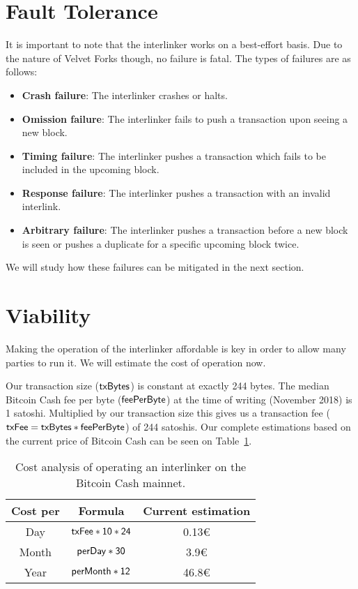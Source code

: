 
\section{Fault Tolerance}
It is important to note that the interlinker works on a best-effort basis. Due to the nature of Velvet Forks though, no failure is fatal. The types of failures are as follows:

\begin{itemize}
  \item \textbf{Crash failure}: The interlinker crashes or halts.
  \item \textbf{Omission failure}: The interlinker fails to push a transaction upon seeing a new block.
  \item \textbf{Timing failure}: The interlinker pushes a transaction which fails to be included in the upcoming block.
  \item \textbf{Response failure}: The interlinker pushes a transaction with an invalid interlink.
  \item \textbf{Arbitrary failure}: The interlinker pushes a transaction before a new block is seen or pushes a duplicate for a specific upcoming block twice.
\end{itemize}

We will study how these failures can be mitigated in the next section.

\section{Viability}
Making the operation of the interlinker affordable is key in order to allow many parties to run it. We will estimate the cost of operation now.

Our transaction size ($\sf txBytes$) is constant at exactly 244 bytes. The median Bitcoin Cash fee per byte ($\sf feePerByte$) at the time of writing (November 2018) is 1 satoshi. Multiplied by our transaction size this gives us a transaction fee ($\sf txFee = txBytes * feePerByte$) of 244 satoshis.  Our complete estimations based on the current price of Bitcoin Cash can be seen on Table~\ref{tbl:cost-analysis}.

\begin{table}
  \centering
  \begin{tabular}{|c|c|c|}
    \hline
    Cost per & Formula & Current estimation \\
    \hline
    Day & $\sf txFee * 10 * 24$ & 0.13€ \\
    Month & $\sf perDay * 30$ & 3.9€ \\
    Year & $\sf perMonth * 12$ & 46.8€ \\
    \hline
  \end{tabular}
  \caption{Cost analysis of operating an interlinker on the Bitcoin Cash mainnet.}
  \label{tbl:cost-analysis}
\end{table}

